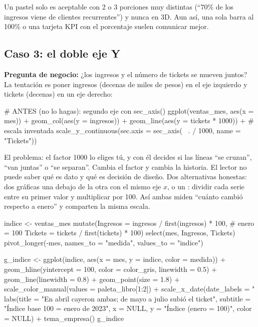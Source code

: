 \begin{consejo}
Un pastel solo es aceptable con 2 o 3 porciones muy distintas (``70\% de los
ingresos viene de clientes recurrentes'') y nunca en 3D. Aun así, una sola
barra al 100\% o una tarjeta KPI con el porcentaje suelen comunicar mejor.
\end{consejo}

\subsection{Caso 3: el doble eje Y}

\textbf{Pregunta de negocio:} ¿los ingresos y el número de tickets se
mueven juntos? La tentación es poner ingresos (decenas de miles de pesos) en
el eje izquierdo y tickets (decenas) en un eje derecho:

\begin{rnoejecutar}
# ANTES (no lo hagas): segundo eje con sec_axis()
ggplot(ventas_mes, aes(x = mes)) +
  geom_col(aes(y = ingresos)) +
  geom_line(aes(y = tickets * 1000)) +              # escala inventada
  scale_y_continuous(sec.axis = sec_axis(~ . / 1000, name = "Tickets"))
\end{rnoejecutar}

El problema: el factor 1000 lo eliges tú, y con él decides si las líneas
``se cruzan'', ``van juntas'' o ``se separan''. Cambia el factor y cambia la
historia. El lector no puede saber qué es dato y qué es decisión de diseño.
Dos alternativas honestas: dos gráficas una debajo de la otra con el mismo
eje $x$, o un : dividir cada serie entre su primer
valor y multiplicar por 100. Así ambas miden ``cuánto cambió respecto a
enero'' y comparten la misma escala.

\begin{rcode}
indice <- ventas_mes %
  mutate(Ingresos = ingresos / first(ingresos) * 100,   # enero = 100
         Tickets  = tickets / first(tickets) * 100) %
  select(mes, Ingresos, Tickets) %
  pivot_longer(-mes, names_to = "medida", values_to = "indice")

g_indice <- ggplot(indice, aes(x = mes, y = indice, color = medida)) +
  geom_hline(yintercept = 100, color = color_gris, linewidth = 0.5) +
  geom_line(linewidth = 0.8) +
  geom_point(size = 1.8) +
  scale_color_manual(values = paleta_libro[1:2]) +
  scale_x_date(date_labels = "%
  labs(title = "En abril cayeron ambas; de mayo a julio subió el ticket",
       subtitle = "Índice base 100 = enero de 2023",
       x = NULL, y = "Índice (enero = 100)", color = NULL) +
  tema_empresa()
g_indice
\end{rcode}

